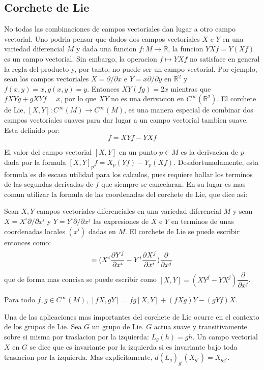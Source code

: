 \documentclass[12pt]{extarticle}
\newcommand{\R}{\mathbb{R}}
\newcommand{\<}{\langle}
\renewcommand{\>}{\rangle}
\theoremstyle{definition}
\begin{document}
\subsection{Corchete de Lie}
No todas las combinaciones de campos vectoriales dan lugar a otro campo
vectorial. Uno podria pensar que dados dos campos vectoriales $X$ e
$Y$ en una variedad diferencial $M$ y dada una funcion $f: M \rightarrow \R$, la
funcion $YXf=Y(Xf)$ es un campo vectorial. Sin embargo, la operacion $f \mapsto
YXf$ no satisface en general la regla del producto y, por tanto, no puede ser un
campo vectorial. Por ejemplo, sean los campos vectoriales $X = \partial / \partial x$
e $Y = x \partial / \partial y$ en $\R^2$ y $f(x, y)=x, g(x, y)=y$. Entonces
$XY(fg) = 2x$ mientras que $fXYg + gXYf = x$, por lo que $XY$ no es una
derivacion en $C^{\infty}(\R^2)$.
El corchete de Lie, $[X, Y]: C^{\infty}(M) \rightarrow C^{\infty}(M)$, es una
manera especial de combinar dos campos vectoriales suaves para dar lugar a un campo
vectorial tambien suave. Esta definido por:
\begin{equation*}
[X, Y]f = XYf - YXf
\end{equation*}

El valor del campo vectorial $[X, Y]$ en un punto $p \in M$ es la derivacion de
$p$ dada por la formula $[X, Y]_p f = X_p(Yf) - Y_p(Xf)$. Desafortunadamente,
esta formula es de escasa utilidad para los calculos, pues requiere hallar los terminos
de las segundas derivadas de $f$ que siempre se cancelaran. En su lugar es mas
comun utilizar la formula de las coordenadas del corchete de Lie, que dice asi:

Sean $X, Y$ campos vectoriales diferenciales en una variedad diferencial $M$ y
sean $X = X^i \partial / \partial x^i$ y $Y = Y^i \partial / \partial x^j$ las
expresiones de $X$ e $Y$ en terminos de unas coordenadas locales $(x^i)$ dadas
en $M$. El corchete de Lie se puede escribir entonces como:
\begin{equation*}
[X, Y] = (X^i \dfrac{\partial Y^j}{\partial x^i} - \\
Y^i \dfrac{\partial X^j}{\partial x^i}) \dfrac {\partial}{\partial x^j}
\end{equation*}
que de forma mas concisa se puede escribir como $[X, Y] = (XY^j - YX^j)
\dfrac{\partial}{\partial x^j}$.

Para todo $f, g \in C^{\infty}(M)$, $[fX, gY] = fg[X,Y] + (fXg)Y - (gYf)X$.

Una de las aplicaciones mas importantes del corchete de Lie ocurre en el
contexto de los grupos de Lie. Sea $G$ un grupo de Lie. $G$ actua suave y transitivamente sobre si misma por
traslacion por la izquierda: $L_g(h) = gh$. Un campo vectorial $X$ en $G$ se
dice que es invariante por la izquierda si es invariante bajo toda traslacion
por la izquierda. Mas explicitamente, $d(L_g)_{g'}(X_{g'}) = X_{gg'}$.
\end{document}
